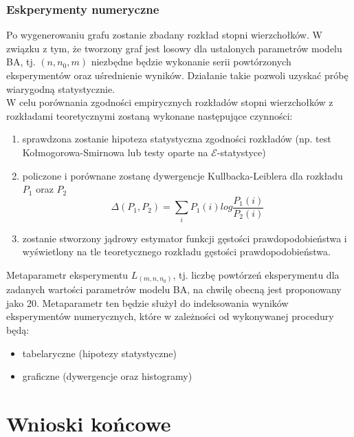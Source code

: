 \documentclass{article}
\def\lecturemark{}
\newcommand{\spr}[1]{\part{#1}\def\lecturemark{\partname\ \thepart: #1}}
\renewcommand{\partname}{Sprawozdanie}
\renewcommand{\thepart}{\arabic{part}}
\begin{document}
\section{Eskperymenty numeryczne \label{s6}} 
	Po wygenerowaniu grafu zostanie zbadany rozkład stopni wierzchołków. W związku z tym, że tworzony graf
	jest losowy dla ustalonych parametrów modelu BA, tj. $(n, n_0, m)$ niezbędne będzie wykonanie
	serii powtórzonych eksperymentów oraz uśrednienie wyników. Działanie takie pozwoli uzyskać próbę 
	wiarygodną statystycznie. \\
	W celu porównania zgodności empirycznych rozkładów stopni wierzchołków z rozkładami teoretycznymi
	zostaną wykonane następujące czynności:
		\begin{enumerate}
			\item sprawdzona zostanie hipoteza statystyczna zgodności rozkładów (np. test Kołmogorowa-Smirnowa lub testy oparte na $\mathcal{E}$-statystyce)
			\item policzone i porównane zostanę dywergencje Kullbacka-Leiblera dla rozkładu $P_1$ oraz $P_2$
				\begin{equation}
					\Delta(P_1, P_2) = \sum_{i} P_{1}(i)log\frac{P_{1}(i)}{P_{2}(i)}
				\end{equation}
			\item zostanie stworzony jądrowy estymator funkcji gęstości prawdopodobieństwa i wyświetlony na tle teoretycznego rozkładu gęstości prawdopodobieństwa. 
		\end{enumerate}
		Metaparametr eksperymentu $L_{(m, n, n_0)}$, tj. liczbę powtórzeń eksperymentu dla zadanych wartości parametrów modelu BA, na chwilę obecną jest proponowany jako 20.  
		Metaparametr ten będzie służył do indeksowania wyników eksperymentów numerycznych, które 
		w zależności od wykonywanej procedury będą:
		\begin{itemize}
			\item tabelaryczne (hipotezy statystyczne) 
			\item graficzne (dywergencje oraz histogramy)
		\end{itemize}
\spr{Wnioski końcowe \label{part3}}
{}

\end{document}
